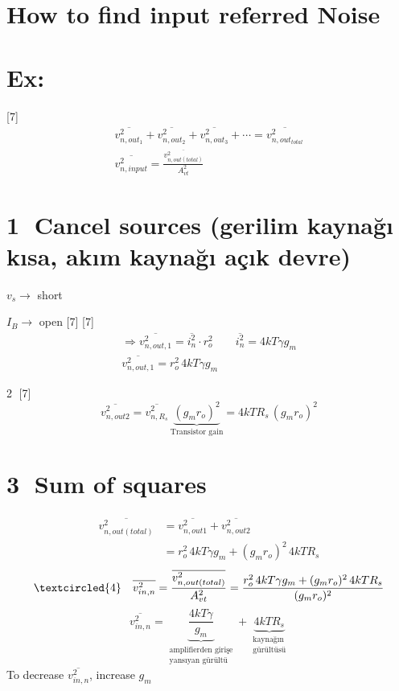 \documentclass[11pt,a4paper]{article}
\begin{document}
\section{How to find input referred Noise}
\section{Ex:}
[7]
\begin{gather*}
\overline{v_{n,out_1}^2} + \overline{v_{n,out_2}^2} + \overline{v_{n,out_3}^2} + \cdots = \overline{v_{n,out_{total}}^2}\\
\overline{v_{n,input}^2} = \frac{\overline{v_{n,out(total)}^2}}{A_{vt}^2}
\end{gather*}

\section{\textcircled{1} Cancel sources (gerilim kaynağı kısa, akım kaynağı açık devre)}
$v_s \to$ short

$I_B \to$ open
[7]
[7]
\begin{gather*}
\Rightarrow \overline{v_{n,out,1}^2} = \overline{i_n^2}\cdot r_o^2 \qquad \overline{i_n^2} = 4kT\gamma g_m\\
\overline{v_{n,out,1}^2} = r_o^2\,4kT\gamma g_m
\end{gather*}

\textcircled{2}
[7]
\[ \overline{v_{n,out2}^2} = \overline{v_{n,R_s}^2}\,\underbrace{(g_mr_o)^2}_{\text{Transistor gain}} = 4kTR_s\,(g_mr_o)^2 \]

\section{\textcircled{3} Sum of squares}
\begin{align*}
\overline{v_{n,out(total)}^2} &= \overline{v_{n,out1}^2} + \overline{v_{n,out2}^2}\\
&= r_o^2\,4kT\gamma g_m + (g_mr_o)^2\,4kTR_s
\end{align*}
\[ \textcircled{4}\quad \overline{v_{in,n}^2} = \frac{\overline{v_{n,out(total)}^2}}{A_{vt}^2} = \frac{r_o^2\,4kT\gamma g_m + (g_mr_o)^2\,4kTR_s}{(g_mr_o)^2} \]
\[ \overline{v_{in,n}^2} = \underbrace{\frac{4kT\gamma}{g_m}}_{\substack{\text{amplifierden girişe}\\ \text{yansıyan gürültü}}} + \underbrace{4kTR_s}_{\substack{\text{kaynağın}\\ \text{gürültüsü}}} \]
To decrease $\overline{v_{in,n}^2}$, increase $g_m$
\end{document}
